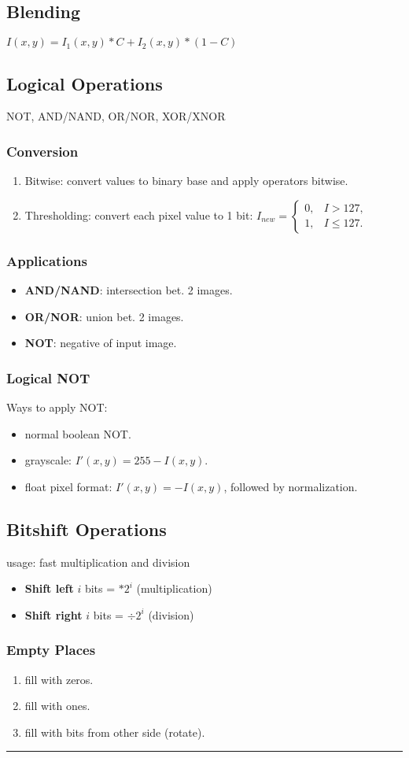 \subsection{Blending}
$I(x,y) = I_1(x,y) * C +  I_2(x,y) * (1-C)$\\
\subsection{Logical Operations}
\textsc{NOT, AND/NAND, OR/NOR, XOR/XNOR}
\subsubsection{Conversion}
\begin{enumerate}
  \item Bitwise: convert values to binary base and apply operators bitwise.
  \item Thresholding: convert each pixel value to 1 bit:
$
  I_{new} =
  \begin{cases}
    0, & I > 127,\\
    1, & I \leq 127.
  \end{cases}
$
\end{enumerate}
\subsubsection{Applications}
\begin{itemize}
  \item \textbf{AND/NAND}: intersection bet. 2 images.
  \item \textbf{OR/NOR}: union bet. 2 images.
  \item \textbf{NOT}: negative of input image.
\end{itemize}
\subsubsection{Logical NOT}
Ways to apply NOT:
\begin{itemize}
  \item normal boolean NOT.
  \item grayscale: $I'(x,y) = 255 - I(x,y)$.
  \item float pixel format: $I'(x,y) = - I(x,y)$, followed by normalization.
\end{itemize}
\subsection{Bitshift Operations}
usage: fast multiplication and division
\begin{itemize}
  \item \textbf{Shift left} $i$ bits = $* 2^i$ (multiplication)
  \item \textbf{Shift right} $i$ bits = $\div 2^i$ (division)
\end{itemize}
\subsubsection{Empty Places}
\begin{enumerate}
  \item fill with zeros.
  \item fill with ones.
  \item fill with bits from other side (rotate).
\end{enumerate}
\hrule
